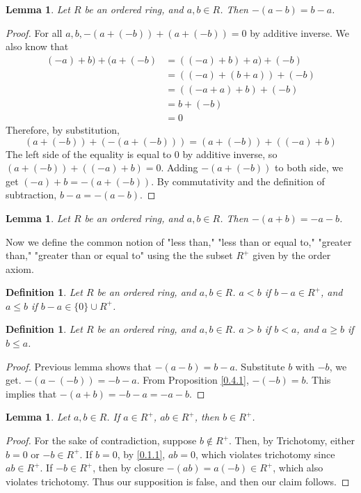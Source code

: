 \documentclass{article}
\newcommand{\FTSOC}{For the sake of contradiction}
\newtheorem{defn}[thm]{Definition}
\newtheorem{lem}[thm]{Lemma}
\begin{document}
\begin{lem}
\label{minus}
Let $R$ be an ordered ring, and $a,b\in R$. Then $-(a-b)=b-a$.
\end{lem}
\begin{proof}
For all $a, b, -(a+(-b))+(a+(-b))=0$ by additive inverse. We also know that 
\begin{equation}
    \begin{split}
        (-a)+b)+(a+(-b)&=((-a)+b)+a)+(-b)\\
        &=((-a)+(b+a))+(-b)\\
        &=((-a+a)+b)+(-b)\\
        &=b+(-b)\\
        &=0
    \end{split}
\end{equation}
Therefore, by substitution,
$$(a+(-b))+(-(a+(-b)))=(a+(-b))+((-a)+b)$$
The left side of the equality is equal to $0$ by additive inverse, so $(a+(-b))+((-a)+b)=0$. Adding $-(a+(-b))$ to both side, we get $(-a)+b=-(a+(-b))$. By commutativity and the definition of subtraction, $b-a=-(a-b)$.
\end{proof}

\begin{lem}
\label{minus2}
Let $R$ be an ordered ring, and $a,b\in R$. Then $-(a+b)=-a-b$.
\end{lem}

\noindent Now we define the common notion of "less than," "less than or equal to," "greater than," "greater than or equal to" using the the subset $R^+$ given by the order axiom.

\begin{defn}
\label{<}
Let $R$ be an ordered ring, and $a, b \in R$. $a<b$ if $b-a \in R^+$, and $a \leq b$ if $b-a \in \{0\} \cup R^+$.
\end{defn}

\begin{defn}
\label{>}
Let $R$ be an ordered ring, and $a, b \in R$. $a>b$ if $b<a$, and $a \geq b$ if $b \leq a$.
\end{defn}


\begin{proof}
Previous lemma shows that $-(a-b)=b-a$. Substitute $b$ with $-b$, we get. $-(a-(-b))=-b-a$. From Proposition \ref{0.4.1}, $-(-b)=b$. This implies that $-(a+b)=-b-a=-a-b$.
\end{proof}

\begin{lem}
\label{converse-closure}
Let $a,b\in R$. If $a\in R^{+}$, $ab\in R^{+}$, then $b\in R^{+}$. 
\end{lem}
\begin{proof}
\FTSOC, suppose $b\not\in R^+$. Then, by Trichotomy, either $b=0$ or $-b\in R^+$. If $b=0$, by \ref{0.1.1}, $ab=0$, which violates trichotomy since $ab\in R^+$. If $-b\in R^+$, then by closure $-(ab)=a(-b)\in R^+$, which also violates trichotomy. Thus our supposition is false, and then our claim follows. 
\end{proof}
\end{document}
